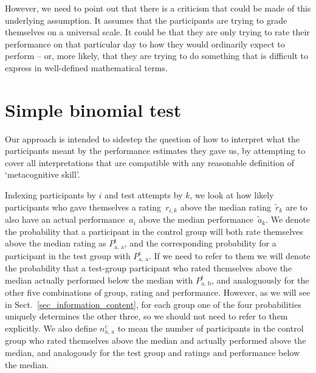 \documentclass[10pt, twoside,a4paper]{article}
\begin{document}
However, we need to point out that there is a criticism that could be made of this underlying assumption. It assumes that the participants are trying to grade themselves on a universal scale. It could be that they are only trying to rate their performance on that particular day to how they would ordinarily expect to perform -- or, more likely, that they are trying to do something that is difficult to express in well-defined mathematical terms.



\newpage
\section{Simple binomial test}\label{sec_binomial}
Our approach is intended to sidestep the question of how to interpret what the participants meant by the performance estimates they gave us, by attempting to cover all interpretations that are compatible with any reasonable definition of `metacognitive skill'.

Indexing participants by $i$ and test attempts by $k$, we look at how likely participants who gave themselves a rating~$r_{i, k}$ above the median rating~$\tilde{r}_k$ are to also have an actual performance~$a_i$ above the median performance~$\tilde{a}_k$. We denote the probability that a participant in the control group will both rate themselves above the median rating as $P^{\text{t}}_{\text{a, a}}$, and the corresponding probability for a participant in the test group with $P^{\text{c}}_{\text{a, a}}$. If we need to refer to them we will denote the probability that a test-group participant who rated themselves above the median actually performed below the median with $P^{\text{t}}_{\text{a, b}}$, and analoguously for the other five combinations of group, rating and performance. However, as we will see in Sect.~\ref{sec_information_content}, for each group one of the four probabilities uniquely determines the other three, so we should not need to refer to them explicitly. We also define $n^c_{\text{a, a}}$ to mean the number of participants in the control group who rated themselves above the median and actually performed above the median, and analogously for the test group and ratings and performance below the median.
\end{document}
